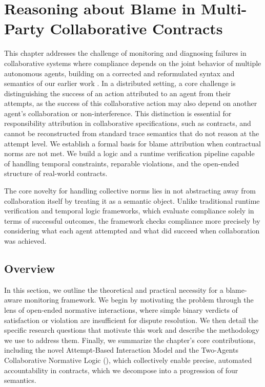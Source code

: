 \chapter{Reasoning about Blame in Multi-Party Collaborative Contracts}\label{chap:monitoring}

This chapter addresses the challenge of monitoring and diagnosing failures in collaborative systems where compliance depends on the joint behavior of multiple autonomous agents, building on a corrected and reformulated syntax and semantics of our earlier work \cite{Kharraz23}. In a distributed setting, a core challenge is distinguishing the success of an action attributed to an agent from their attempts, as the success of this collaborative action may also depend on another agent's collaboration or non-interference. This distinction is essential for responsibility attribution in collaborative specifications, such as contracts, and cannot be reconstructed from standard trace semantics that do not reason at the attempt level. We establish a formal basis for blame attribution when contractual norms are not met. We build a logic and a runtime verification pipeline capable of handling temporal constraints, reparable violations, and the open-ended structure of real-world contracts.



The core novelty for handling collective norms lies in not abstracting away from collaboration itself by treating it as a semantic object. Unlike traditional runtime verification and temporal logic frameworks, which evaluate compliance solely in terms of successful outcomes, the framework checks compliance more precisely by considering what each agent attempted and what did succeed when collaboration was achieved.

\section{Overview}

In this section, we outline the theoretical and practical necessity for a blame-aware monitoring framework. We begin by motivating the problem through the lens of open-ended normative interactions, where simple binary verdicts of satisfaction or violation are insufficient for dispute resolution. We then detail the specific research questions that motivate this work and describe the methodology we use to address them. Finally, we summarize the chapter's core contributions, including the novel Attempt-Based Interaction Model and the Two-Agents Collaborative Normative Logic (\cDL), which collectively enable precise, automated accountability in contracts, which we decompose into a progression of four semantics.



